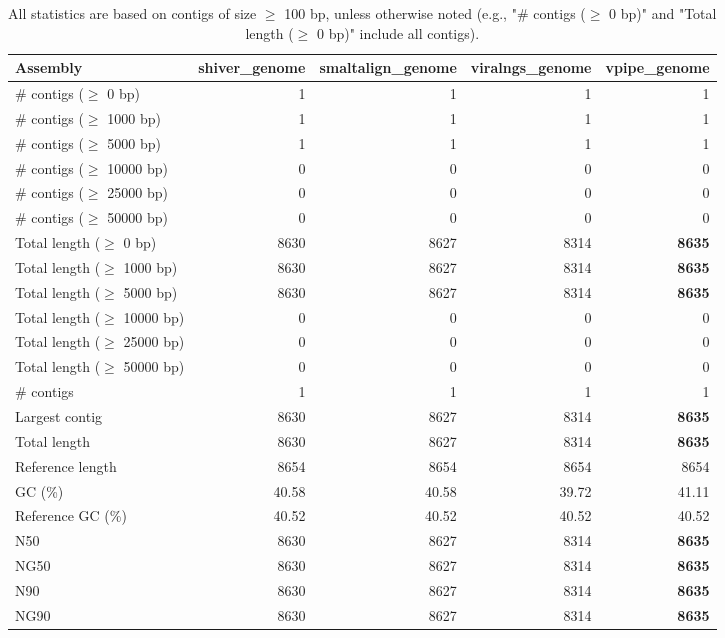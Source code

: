 \documentclass[12pt,a4paper]{article}
\begin{document}
\begin{table}[ht]
\begin{center}
\caption{All statistics are based on contigs of size $\geq$ 100 bp, unless otherwise noted (e.g., "\# contigs ($\geq$ 0 bp)" and "Total length ($\geq$ 0 bp)" include all contigs).}
\begin{tabular}{|l*{4}{|r}|}
\hline
Assembly & shiver\_genome & smaltalign\_genome & viralngs\_genome & vpipe\_genome \\ \hline
\# contigs ($\geq$ 0 bp) & 1 & 1 & 1 & 1 \\ \hline
\# contigs ($\geq$ 1000 bp) & 1 & 1 & 1 & 1 \\ \hline
\# contigs ($\geq$ 5000 bp) & 1 & 1 & 1 & 1 \\ \hline
\# contigs ($\geq$ 10000 bp) & 0 & 0 & 0 & 0 \\ \hline
\# contigs ($\geq$ 25000 bp) & 0 & 0 & 0 & 0 \\ \hline
\# contigs ($\geq$ 50000 bp) & 0 & 0 & 0 & 0 \\ \hline
Total length ($\geq$ 0 bp) & 8630 & 8627 & 8314 & {\bf 8635} \\ \hline
Total length ($\geq$ 1000 bp) & 8630 & 8627 & 8314 & {\bf 8635} \\ \hline
Total length ($\geq$ 5000 bp) & 8630 & 8627 & 8314 & {\bf 8635} \\ \hline
Total length ($\geq$ 10000 bp) & 0 & 0 & 0 & 0 \\ \hline
Total length ($\geq$ 25000 bp) & 0 & 0 & 0 & 0 \\ \hline
Total length ($\geq$ 50000 bp) & 0 & 0 & 0 & 0 \\ \hline
\# contigs & 1 & 1 & 1 & 1 \\ \hline
Largest contig & 8630 & 8627 & 8314 & {\bf 8635} \\ \hline
Total length & 8630 & 8627 & 8314 & {\bf 8635} \\ \hline
Reference length & 8654 & 8654 & 8654 & 8654 \\ \hline
GC (\%) & 40.58 & 40.58 & 39.72 & 41.11 \\ \hline
Reference GC (\%) & 40.52 & 40.52 & 40.52 & 40.52 \\ \hline
N50 & 8630 & 8627 & 8314 & {\bf 8635} \\ \hline
NG50 & 8630 & 8627 & 8314 & {\bf 8635} \\ \hline
N90 & 8630 & 8627 & 8314 & {\bf 8635} \\ \hline
NG90 & 8630 & 8627 & 8314 & {\bf 8635} \\ \hline

\end{tabular}
\end{center}
\end{table}
\end{document}

